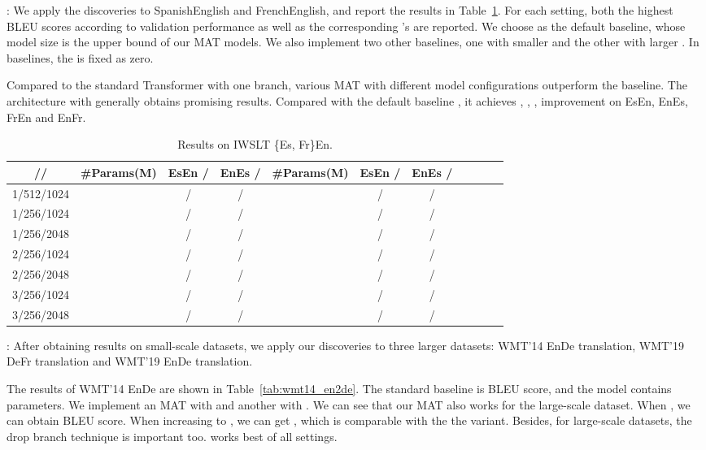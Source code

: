 \documentclass{article}
\begin{document}
: We apply the discoveries to SpanishEnglish and FrenchEnglish, and report the results in Table~\ref{tab:results_iwslt_esfren}.
For each setting, both the highest BLEU scores according to validation performance as well as the corresponding 's are reported. We choose  as the default baseline, whose model size is the upper bound of our MAT models. We also implement two other baselines, one with smaller  and the other with larger . In baselines, the  is fixed as zero.

Compared to the standard Transformer with one branch, various MAT with different model configurations outperform the baseline. The architecture  with  generally obtains promising results. Compared with the default baseline , it achieves , , ,  improvement on EsEn, EnEs, FrEn and EnFr. 

\begin{table}[!htbp]
\vspace{-2mm}
\centering
\caption{Results on IWSLT \{Es, Fr\}En. }
\begin{tabular}{c|ccc|ccccccc}
\toprule
// & \#Params(M)  & EsEn /  & EnEs /  & \#Params(M)  & EsEn /  & EnEs /  \\
\midrule
1/512/1024 &  &  /   &  /  &  &  /  &  /  \\
1/256/1024 &  &  /   &  /  &  &  /  &  /  \\
1/256/2048 &  &  /   &  /  &  &  /  &  /  \\
\hline
2/256/1024 &  &  /   &  /  &  &  /  &  /  \\
2/256/2048 &  &  /   &  /  &  &  /  &  /  \\
3/256/1024 &  &  /   &  /  &  &  /  &  /  \\
3/256/2048 &  &  /   &  /  &  &  /  &  /  \\
\bottomrule
\end{tabular}
\label{tab:results_iwslt_esfren}
\vspace{-4mm}
\end{table}

: After obtaining results on small-scale datasets, we apply our discoveries to three larger datasets: WMT'14 EnDe translation, WMT'19 DeFr translation and WMT'19 EnDe translation.

The results of WMT'14 EnDe are shown in Table~\ref{tab:wmt14_en2de}. The standard baseline is  BLEU score, and the model contains  parameters. We implement an MAT with  and another with . We can see that our MAT also works for the large-scale dataset. When , we can obtain  BLEU score. When increasing  to , we can get , which is comparable with the the  variant. Besides, for large-scale datasets, the drop branch technique is important too.  works best of all settings. 
\end{document}

